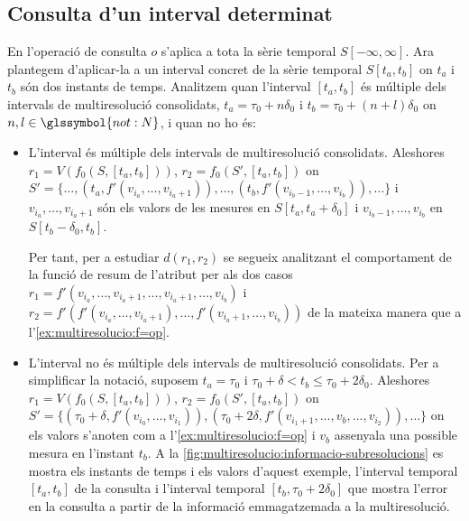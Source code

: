 \subsection{Consulta d'un interval determinat}
\label{ex:multireoslucio:informacio-subresolucions}



En  l'operació de consulta $o$
s'aplica a tota la sèrie temporal $S[-\infty,\infty]$. Ara plantegem
d'aplicar-la a un interval concret de la sèrie temporal $S[t_a,t_b]$
on $t_a$ i $t_b$ són dos instants de temps.  Analitzem quan l'interval
$[t_a,t_b]$ és múltiple dels intervals de multiresolució consolidats,
$t_a=\tau_0+n\delta_0$ i $t_b=\tau_0+(n+l)\delta_0$ on
$n,l\in\glssymbol{not:N}$, i quan no ho és:

\begin{itemize}
\item L'interval és múltiple dels intervals de multiresolució
  consolidats. Aleshores $r_1=V(f_0(S,[t_a,t_b]))$,
  $r_2=f_0(S',[t_a,t_b])$ on $S'= \{ \dotsc, (t_a,
  f'(v_{i_a},\dotsc,v_{i_a+1}) ), \dotsc, (t_b,
  f'(v_{i_b-1},\dotsc,v_{i_b})), \dotsc \}$ i
  $v_{i_a},\dotsc,v_{i_a+1}$ són els valors de les mesures en
  $S[t_a,t_a+\delta_0]$ i $v_{i_b-1},\dotsc,v_{i_b}$ en
  $S[t_b-\delta_0,t_b]$.

  Per tant, per a estudiar $d(r_1,r_2)$ se segueix analitzant el
  comportament de la funció de resum de l'atribut per als dos casos
  $r_1=f'(v_{i_a},\dotsc,v_{i_a+1},\dotsc, v_{i_a+1},\dotsc,v_{i_b})$
  i $r_2=f'(f'(v_{i_a},\dotsc,v_{i_a+1}),\dotsc,
  f'(v_{i_a+1},\dotsc,v_{i_b}))$ de la mateixa manera que a 
  l'\autoref{ex:multiresolucio:f=op}.


\item L'interval no és múltiple dels intervals de multiresolució
  consolidats.  Per a simplificar la notació, suposem $t_a=\tau_0$ i
  $\tau_0+\delta < t_b \leq \tau_0+2\delta_0$.  Aleshores
  $r_1=V(f_0(S,[t_a,t_b]))$, $r_2=f_0(S',[t_a,t_b])$ on $S'=
  \{(\tau_0+\delta, f'(v_{i_0},\dotsc,v_{i_1}) ),(\tau_0+2\delta ,
  f'(v_{i_1+1},\dotsc,v_{b} ,\dotsc,v_{i_2})), \dotsc \}$ on els
  valors s'anoten com a l'\autoref{ex:multiresolucio:f=op} i $v_b$
  assenyala una possible mesura en l'instant $t_b$.  A la
  \autoref{fig:multiresolucio:informacio-subresolucions} es mostra els
  instants de temps i els valors d'aquest exemple, l'interval
  temporal $[t_a,t_b]$ de la consulta i l'interval temporal
  $[t_b,\tau_0+2\delta_0]$ que mostra l'error en la consulta a partir
  de la informació emmagatzemada a la multiresolució.



\end{itemize}
